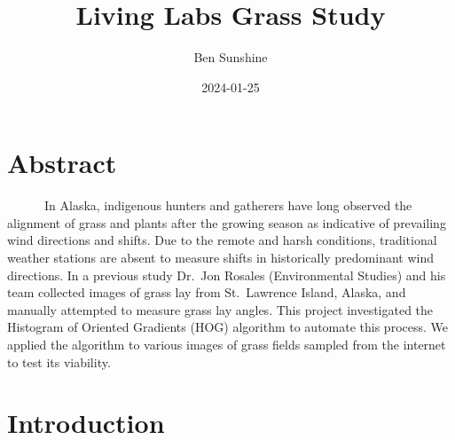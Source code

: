 \documentclass[
  letterpaper,
  DIV=11,
  numbers=noendperiod]{scrreprt}
\title{Living Labs Grass Study}
\author{Ben Sunshine}
\date{2024-01-25}
\renewcommand*\contentsname{Table of contents}
\newcommand\contentsname{Table of contents}
\begin{document}
\maketitle
\ifdefined\Shaded\renewenvironment{Shaded}{\begin{tcolorbox}[frame hidden, sharp corners, interior hidden, breakable, boxrule=0pt, enhanced, borderline west={3pt}{0pt}{shadecolor}]}{\end{tcolorbox}}\fi

\renewcommand*\contentsname{Table of contents}
{
\hypersetup{linkcolor=}
\setcounter{tocdepth}{2}
\tableofcontents
}

\hypertarget{abstract}{%
\chapter{Abstract}\label{abstract}}

~~~~~~In Alaska, indigenous hunters and gatherers have long observed the
alignment of grass and plants after the growing season as indicative of
prevailing wind directions and shifts. Due to the remote and harsh
conditions, traditional weather stations are absent to measure shifts in
historically predominant wind directions. In a previous study Dr.~Jon
Rosales (Environmental Studies) and his team collected images of grass
lay from St.~Lawrence Island, Alaska, and manually attempted to measure
grass lay angles. This project investigated the Histogram of Oriented
Gradients (HOG) algorithm to automate this process. We applied the
algorithm to various images of grass fields sampled from the internet to
test its viability.


\hypertarget{introduction}{%
\chapter{Introduction}\label{introduction}}
\end{document}
